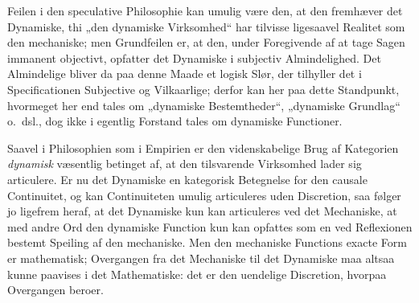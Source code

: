 \documentclass[12pt]{book}
\begin{document}
Feilen i den speculative Philosophie kan umulig være den, at den fremhæver det Dynamiske,
thi „den dynamiske Virksomhed“ har tilvisse ligesaavel Realitet som den mechaniske; men
Grundfeilen er, at den, under Foregivende af at tage Sagen immanent objectivt, opfatter det
Dynamiske i subjectiv Almindelighed. Det Almindelige bliver da paa denne Maade et logisk
Slør, der tilhyller det i Specificationen Subjective og Vilkaarlige; derfor kan her paa
dette Standpunkt, hvormeget her end tales om „dynamiske Bestemtheder“, „dynamiske Grundlag“
o.\ dsl., dog ikke i egentlig Forstand tales om dynamiske Functioner.

Saavel i Philosophien som i Empirien er den videnskabelige Brug af Kategorien
\emph{dynamisk} væsentlig betinget af, at den tilsvarende Virksomhed lader sig articulere.
Er nu det Dynamiske en kategorisk Betegnelse for den causale Continuitet, og kan
Continuiteten umulig articuleres uden Discretion, saa følger jo ligefrem heraf, at det
Dynamiske kun kan articuleres ved det Mechaniske, at med andre Ord den dynamiske Function
kun kan opfattes som en ved Reflexionen bestemt Speiling af den mechaniske. Men den
mechaniske Functions exacte Form er mathematisk; Overgangen fra det Mechaniske til det
Dynamiske maa altsaa kunne paavises i det Mathematiske: det er den uendelige Discretion,
hvorpaa Overgangen beroer.
\end{document}
